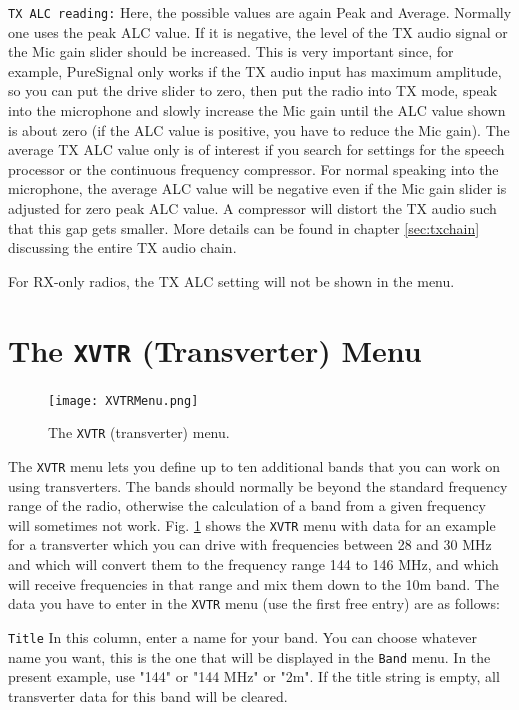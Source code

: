 \documentclass[12pt]{book}
\def\rett#1{\texttt{\color{red}#1}}
\def\bltt#1{\texttt{\color{blue}#1}}
\begin{document}
\rett{TX ALC reading:} Here, the possible values are again Peak and Average.
 Normally one uses the peak ALC value. If it is negative, the level
of the TX audio signal or the Mic gain slider should be increased.
This is very important since, for example,
PureSignal only works if the TX audio input has maximum amplitude,
so you can put the drive slider to zero, then put the radio into TX mode,
speak into the microphone and slowly increase the Mic gain until the
ALC value shown is about zero (if the ALC value is positive, you
have to reduce the Mic gain). The average TX ALC
value only is of interest if  you search for settings for the speech processor
or the continuous frequency compressor. For normal speaking into the microphone,
the average ALC value will be negative even if the Mic gain slider is adjusted
for zero peak ALC value. A compressor will distort the TX audio such that this
gap gets smaller. More details can be found in chapter \ref{sec:txchain}
discussing the entire TX audio chain.

For RX-only radios, the TX ALC setting will not be shown in the menu.

\section{The \texttt{XVTR} (Transverter) Menu}

\begin{figure}[ht]
\center
\texttt{[image: XVTRMenu.png]}
\caption{The \bltt{XVTR} (transverter) menu.}
\label{fig:XVTRMenu}
\end{figure}

The \bltt{XVTR} menu lets you define up to ten additional bands
that you can work on using transverters. The bands
should normally be beyond the standard frequency range of
the radio, otherwise the calculation of a band from
a given frequency will sometimes not work.
Fig. \ref{fig:XVTRMenu} shows the \bltt{XVTR} menu with data
for an example for a transverter which you can drive with frequencies
between 28 and 30 MHz and which will convert them to the frequency
range 144 to 146 MHz, and which will receive frequencies in that
range and mix them down to the 10m band. The data you have to enter
in the \bltt{XVTR} menu (use the first free entry) are as follows:

\rett{Title} In this column, enter a name for your band. You can choose
whatever name you want, this is the one that will be displayed in the
\bltt{Band} menu. In the present example, use "144" or "144 MHz" or "2m".
If the title string is empty, all transverter data for this band will
be cleared.
\end{document}
